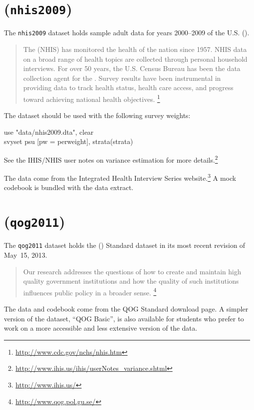 \section*{\nhis (\texttt{nhis2009})}

The \texttt{nhis2009} dataset holds sample adult data for years 2000--2009 of the U.S. \nhis (\NHIS).

\begin{quote}
	The \nhis (NHIS) has monitored the health of the nation since 1957. NHIS data on a broad range of health topics are collected through personal household interviews. For over 50 years, the U.S. Census Bureau has been the data collection agent for the \NHIS. Survey results have been instrumental in providing data to track health status, health care access, and progress toward achieving national health objectives.%
	\footnote{\url{http://www.cdc.gov/nchs/nhis.htm}} 
\end{quote}

The \NHIS dataset should be used with the following survey weights:

\begin{docspec}
    use "data/nhis2009.dta", clear\\
    svyset psu [pw = perweight], strata(strata)
\end{docspec}

See the IHIS/NHIS user notes on variance estimation for more details.\footnote{\url{http://www.ihis.us/ihis/userNotes_variance.shtml}}

The data come from the Integrated Health Interview Series website.\footnote{\url{http://www.ihis.us/}} A mock codebook is bundled with the data extract.

\section*{\qog (\texttt{qog2011})}

The \texttt{qog2011} dataset holds the \qog (\QOG) Standard dataset in its most recent revision of May~15, 2013.

\begin{quote}
	Our research addresses the questions of how to create and maintain high quality government institutions and how the quality of such institutions influences public policy in a broader sense.%
  \footnote{\url{http://www.qog.pol.gu.se/}}%
\end{quote}

The data and codebook come from the QOG Standard download page. A simpler version of the dataset, ``QOG Basic'', is also available for students who prefer to work on a more accessible and less extensive version of the data.

